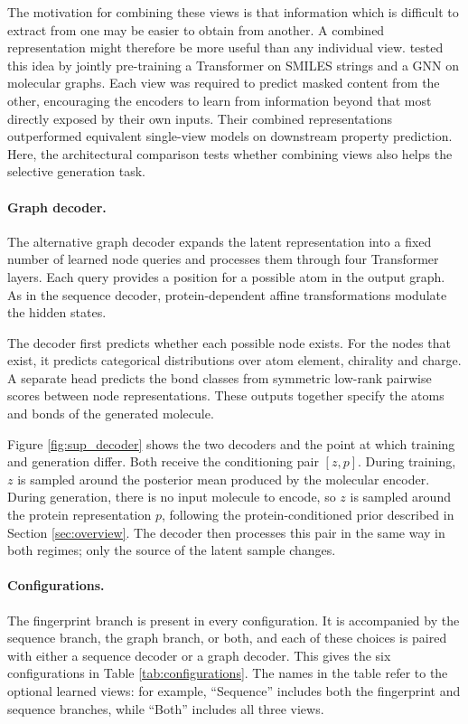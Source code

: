 \documentclass[a4paper,12pt]{article}
\begin{document}
The motivation for combining these views is that information which is difficult to extract from one may be easier to obtain from another. A combined representation might therefore be more useful than any individual view. \textcite{Zhu_Xia_Wu_Xie_Zhou_Qin_Li_Liu_2023} tested this idea by jointly pre-training a Transformer on SMILES strings and a GNN on molecular graphs. Each view was required to predict masked content from the other, encouraging the encoders to learn from information beyond that most directly exposed by their own inputs. Their combined representations outperformed equivalent single-view models on downstream property prediction. Here, the architectural comparison tests whether combining views also helps the selective generation task.

\paragraph{Graph decoder.}
The alternative graph decoder expands the latent representation into a fixed number of learned node queries and processes them through four Transformer layers. Each query provides a position for a possible atom in the output graph. As in the sequence decoder, protein-dependent affine transformations modulate the hidden states.

The decoder first predicts whether each possible node exists. For the nodes that exist, it predicts categorical distributions over atom element, chirality and charge. A separate head predicts the bond classes from symmetric low-rank pairwise scores between node representations. These outputs together specify the atoms and bonds of the generated molecule.

Figure \ref{fig:sup_decoder} shows the two decoders and the point at which training and generation differ. Both receive the conditioning pair $[z, p]$. During training, $z$ is sampled around the posterior mean produced by the molecular encoder. During generation, there is no input molecule to encode, so $z$ is sampled around the protein representation $p$, following the protein-conditioned prior described in Section \ref{sec:overview}. The decoder then processes this pair in the same way in both regimes; only the source of the latent sample changes.

\paragraph{Configurations.}
The fingerprint branch is present in every configuration. It is accompanied by the sequence branch, the graph branch, or both, and each of these choices is paired with either a sequence decoder or a graph decoder. This gives the six configurations in Table \ref{tab:configurations}. The names in the table refer to the optional learned views: for example, ``Sequence'' includes both the fingerprint and sequence branches, while ``Both'' includes all three views.
\end{document}

